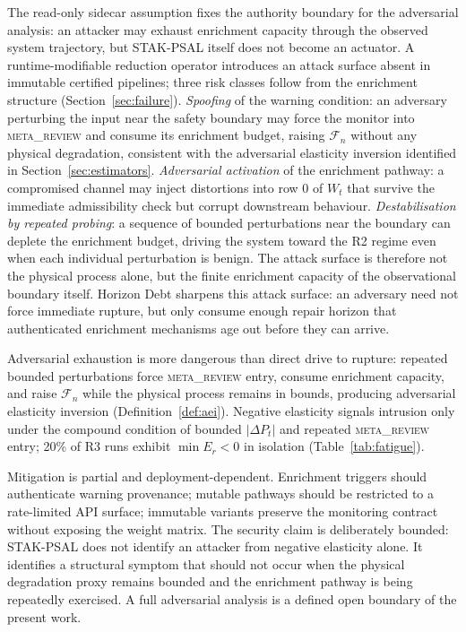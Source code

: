 \documentclass{llncs}
\newcommand{\st}[1]{\textup{\textsc{#1}}}
\begin{document}
The read-only sidecar assumption fixes the authority boundary for the adversarial analysis: an attacker may exhaust enrichment capacity through the observed system trajectory, but STAK-PSAL itself does not become an actuator.
A runtime-modifiable reduction operator introduces an attack surface
absent in immutable certified pipelines; three risk classes follow
from the enrichment structure (Section~\ref{sec:failure}).
\textit{Spoofing} of the warning condition: an adversary perturbing the
input near the safety boundary may force the monitor into
\st{meta\_review} and consume its enrichment budget, raising
$\mathcal{F}_n$ without any physical degradation, consistent with the
adversarial elasticity inversion identified in
Section~\ref{sec:estimators}.
\textit{Adversarial activation} of the enrichment pathway: a compromised
channel may inject distortions into row 0 of $W_t$ that survive the
immediate admissibility check but corrupt downstream behaviour.
\textit{Destabilisation by repeated probing}: a sequence of bounded
perturbations near the boundary can deplete the enrichment budget,
driving the system toward the R2 regime even when each individual
perturbation is benign. The attack surface is therefore not the physical process alone, but the
finite enrichment capacity of the observational boundary itself. Horizon Debt sharpens this attack surface: an adversary need not force immediate rupture, but only consume enough repair horizon that authenticated enrichment mechanisms age out before they can arrive.

Adversarial exhaustion is more dangerous than direct drive to rupture:
repeated bounded perturbations force \st{meta\_review} entry, consume
enrichment capacity, and raise $\mathcal{F}_n$ while the physical
process remains in bounds, producing adversarial elasticity inversion
(Definition~\ref{def:aei}). Negative elasticity signals intrusion only
under the compound condition of bounded $|\Delta P_t|$ and repeated
\st{meta\_review} entry; 20\% of R3 runs exhibit $\min E_r < 0$
in isolation (Table~\ref{tab:fatigue}).

Mitigation is partial and deployment-dependent. Enrichment triggers
should authenticate warning provenance; mutable pathways should be
restricted to a rate-limited API surface; immutable variants preserve the monitoring contract without
exposing the weight matrix. The security claim is deliberately bounded:
STAK-PSAL does not identify an attacker from negative elasticity alone.
It identifies a structural symptom that should not occur when the
physical degradation proxy remains bounded and the enrichment pathway is
being repeatedly exercised. A full adversarial analysis is a defined
open boundary of the present work.
\end{document}
